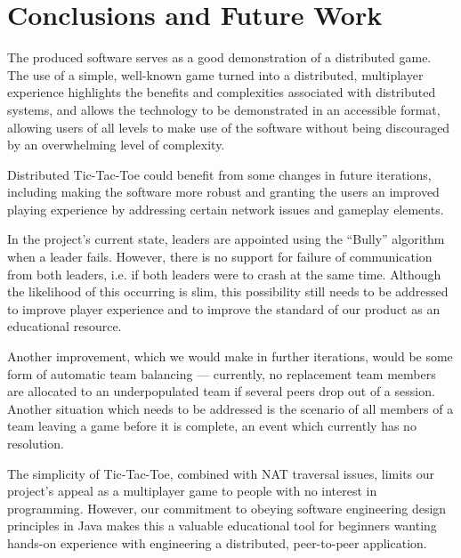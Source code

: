 \documentclass[conference]{IEEEtran}
\begin{document}
\section{Conclusions and Future Work}

The produced software serves as a good demonstration of a distributed game. The use of a simple, well-known game turned into a distributed, multiplayer experience highlights the benefits and complexities associated with distributed systems, and allows the technology to be demonstrated in an accessible format, allowing users of all levels to make use of the software without being discouraged by an overwhelming level of complexity.

Distributed Tic-Tac-Toe could benefit from some changes in future iterations, including making the software more robust and granting the users an improved playing experience by addressing certain network issues and gameplay elements.

In the project's current state, leaders are appointed using the
``Bully'' algorithm when a leader fails. However, there is no support
for failure of communication from both leaders, i.e. if both leaders
were to crash at the same time. Although the likelihood of this
occurring is slim, this possibility still needs to be addressed to
improve player experience and to improve the standard of our product
as an educational resource.

Another improvement, which we would make in further iterations, would be some form of automatic team balancing --- currently, no replacement team members are allocated to an underpopulated team if several peers drop out of a session. Another situation which needs to be addressed is the scenario of all members of a team leaving a game before it is complete, an event which currently has no resolution.

The simplicity of Tic-Tac-Toe, combined with NAT traversal issues, limits our project's appeal as a multiplayer game to people with no interest in programming. However, our commitment to obeying software engineering design principles in Java makes this a valuable educational tool for beginners wanting hands-on experience with engineering a distributed, peer-to-peer application.





\end{document}
